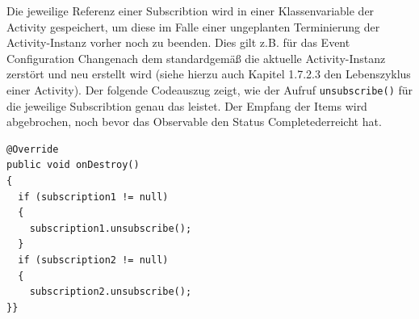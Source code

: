 \documentclass[12pt,oneside,a4paper,bibtotoc,liststotoc]{scrreprt}
\begin{document}
Die jeweilige Referenz einer Subscribtion wird in einer Klassenvariable der Activity gespeichert, um diese im Falle einer ungeplanten Terminierung der Activity-Instanz vorher noch zu beenden. Dies gilt z.B. für das Event \grqq Configuration Change\grqq nach dem standardgemäß die aktuelle Activity-Instanz zerstört und neu erstellt wird (siehe hierzu auch Kapitel 1.7.2.3 den Lebenszyklus einer Activity). Der folgende Codeauszug zeigt, wie der Aufruf \texttt{unsubscribe()} für die jeweilige Subscribtion genau das leistet. Der Empfang der Items wird abgebrochen, noch bevor das Observable den Status \grqq Completed\grqq erreicht hat.\newline
\begin{lstlisting}
@Override
public void onDestroy() 
{
  if (subscription1 != null) 
  {
    subscription1.unsubscribe();
  }
  if (subscription2 != null) 
  {
    subscription2.unsubscribe();
}}
\end{lstlisting}
\end{document}
